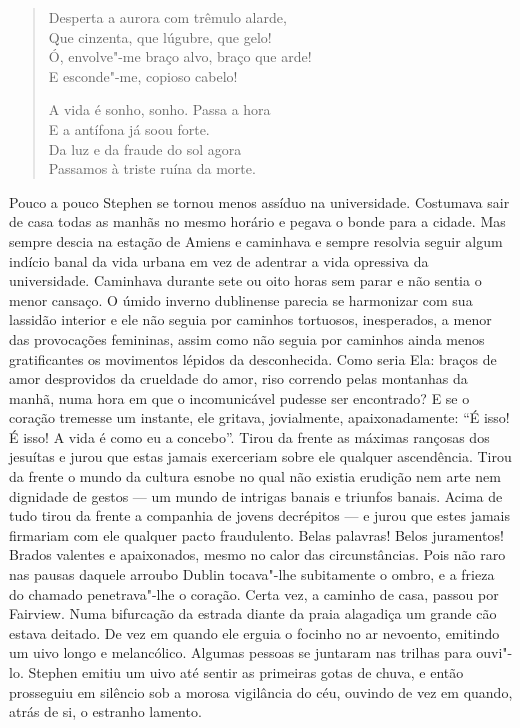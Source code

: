 \begin{verse}
Desperta a aurora com trêmulo alarde,\\
\hspace*{2em} Que cinzenta, que lúgubre, que gelo!\\
Ó, envolve"-me braço alvo, braço que arde!\\
\hspace*{2em} E esconde"-me, copioso cabelo!

A vida é sonho, sonho. Passa a hora\\
\hspace*{2em} E a antífona já soou forte.\\
Da luz e da fraude do sol agora\\
\hspace*{2em} Passamos à triste ruína da morte.
\end{verse}

Pouco a pouco Stephen se tornou menos assíduo na universidade.
Costumava sair de casa todas as manhãs no mesmo horário e pegava o
bonde para a cidade.  Mas sempre descia na estação de Amiens e
caminhava e sempre resolvia seguir algum indício banal da vida urbana
em vez de adentrar a vida opressiva da universidade.  Caminhava durante
sete ou oito horas sem parar e não sentia o menor cansaço.  O úmido
inverno dublinense parecia se harmonizar com sua lassidão interior e
ele não seguia por caminhos tortuosos, inesperados, a menor das
provocações femininas, assim como não seguia por caminhos ainda menos
gratificantes os movimentos lépidos da desconhecida.  Como seria Ela:
braços de amor desprovidos da crueldade do amor, riso correndo pelas
montanhas da manhã, numa hora em que o incomunicável pudesse ser
encontrado?  E se o coração tremesse um instante, ele gritava,
jovialmente, apaixonadamente: “É isso!  É isso!  A vida é como eu a
concebo”.  Tirou da frente as máximas rançosas dos jesuítas e jurou
que estas jamais exerceriam sobre ele qualquer ascendência.  Tirou da
frente o mundo da cultura esnobe no qual não existia erudição nem arte
nem dignidade de gestos --- um mundo de intrigas banais e triunfos
banais.  Acima de tudo tirou da frente a companhia de jovens
decrépitos --- e jurou que estes jamais firmariam com ele qualquer
pacto fraudulento.  Belas palavras!  Belos juramentos!  Brados valentes
e apaixonados, mesmo no calor das circunstâncias.  Pois não raro nas
pausas daquele arroubo Dublin tocava"-lhe subitamente o ombro, \label{e"-a} e a
frieza do chamado penetrava"-lhe o coração.  Certa vez, a caminho de casa,
passou por Fairview.  Numa bifurcação da estrada diante da praia
alagadiça um grande cão estava deitado.  De vez em quando ele erguia o
focinho no ar nevoento, emitindo um uivo longo e melancólico.  Algumas
pessoas se juntaram nas trilhas para ouvi"-lo. Stephen emitiu um uivo
até sentir as primeiras gotas de chuva, e então prosseguiu em silêncio
sob a morosa vigilância do céu, ouvindo de vez em quando, atrás de si,
o estranho lamento.

